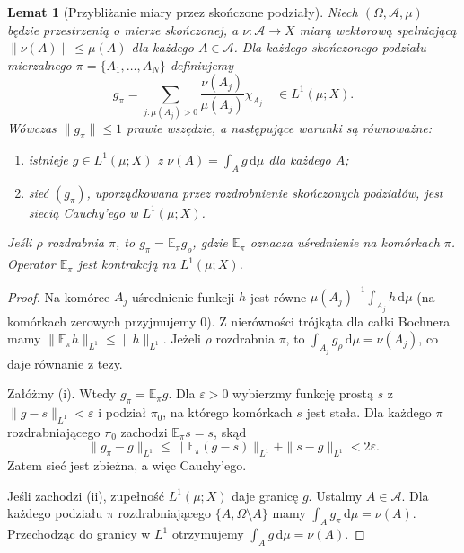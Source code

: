 \documentclass[11pt,a4paper,oneside]{book}
\numberwithin{equation}{chapter}
\theoremstyle{plain}
\newtheorem{lemat}[twierdzenie]{Lemat}
\theoremstyle{definition}
\theoremstyle{remark}
\begin{document}
\begin{lemat}[Przybliżanie miary przez skończone podziały]
\label{lem:rnp-partition-30}
Niech $(\Omega,\mathcal A,\mu)$ będzie przestrzenią
o mierze skończonej, a $\nu:\mathcal A\to X$ miarą
wektorową spełniającą $\|\nu(A)\|\le\mu(A)$
dla każdego $A\in\mathcal A$.
Dla każdego skończonego podziału mierzalnego
$\pi=\{A_1,\ldots,A_N\}$ definiujemy
\[
 g_\pi=\sum_{j:\mu(A_j)>0}
 \frac{\nu(A_j)}{\mu(A_j)}\chi_{A_j}
 \quad\in L^1(\mu;X).
\]
Wówczas $\|g_\pi\|\le1$ prawie wszędzie,
a następujące warunki są równoważne:
\begin{enumerate}[label=(\roman*)]
 \item istnieje $g\in L^1(\mu;X)$ z
       $\nu(A)=\int_Ag\,\mathrm d\mu$ dla każdego $A$;
 \item sieć $(g_\pi)$, uporządkowana przez
       rozdrobnienie skończonych podziałów,
       jest siecią Cauchy'ego w $L^1(\mu;X)$.
\end{enumerate}
Jeśli $\rho$ rozdrabnia $\pi$, to
$g_\pi=\mathbb E_\pi g_\rho$, gdzie
$\mathbb E_\pi$ oznacza uśrednienie na komórkach
$\pi$. Operator $\mathbb E_\pi$ jest kontrakcją
na $L^1(\mu;X)$.
\end{lemat}
\begin{proof}
Na komórce $A_j$ uśrednienie funkcji $h$ jest równe
$\mu(A_j)^{-1}\int_{A_j}h\,\mathrm d\mu$
(na komórkach zerowych przyjmujemy $0$).
Z nierówności trójkąta dla całki Bochnera mamy
$\|\mathbb E_\pi h\|_{L^1}\le\|h\|_{L^1}$.
Jeżeli $\rho$ rozdrabnia $\pi$, to
$\int_{A_j}g_\rho\,\mathrm d\mu=\nu(A_j)$,
co daje równanie z tezy.

Załóżmy (i). Wtedy $g_\pi=\mathbb E_\pi g$.
Dla $\varepsilon>0$ wybierzmy funkcję prostą
$s$ z $\|g-s\|_{L^1}<\varepsilon$ i podział
$\pi_0$, na którego komórkach $s$ jest stała.
Dla każdego $\pi$ rozdrabniającego $\pi_0$
zachodzi $\mathbb E_\pi s=s$, skąd
\[
 \|g_\pi-g\|_{L^1}
 \le\|\mathbb E_\pi(g-s)\|_{L^1}+\|s-g\|_{L^1}
 <2\varepsilon.
\]
Zatem sieć jest zbieżna, a więc Cauchy'ego.

Jeśli zachodzi (ii), zupełność $L^1(\mu;X)$
daje granicę $g$. Ustalmy $A\in\mathcal A$.
Dla każdego podziału $\pi$ rozdrabniającego
$\{A,\Omega\setminus A\}$ mamy
$\int_Ag_\pi\,\mathrm d\mu=\nu(A)$.
Przechodząc do granicy w $L^1$ otrzymujemy
$\int_Ag\,\mathrm d\mu=\nu(A)$.
\end{proof}
\end{document}
